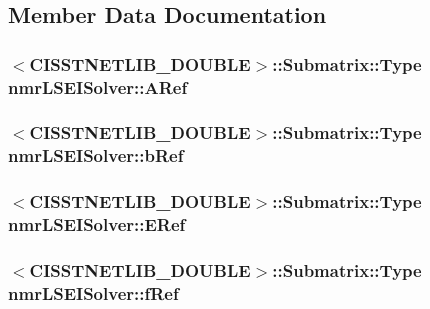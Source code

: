 \subsection{Member Data Documentation}
\hypertarget{classnmr_l_s_e_i_solver_aec36ff37069c0f838c9cf92b8ab607b9}{
\subsubsection[{A\-Ref}]{$<$C\-I\-S\-S\-T\-N\-E\-T\-L\-I\-B\-\_\-\-D\-O\-U\-B\-L\-E$>$\-::Submatrix\-::\-Type nmr\-L\-S\-E\-I\-Solver\-::\-A\-Ref\hspace{0.3cm}{\ttfamily [protected]}}}\label{classnmr_l_s_e_i_solver_aec36ff37069c0f838c9cf92b8ab607b9}
\hypertarget{classnmr_l_s_e_i_solver_a379afee982530ff5d7d0c60b6b1a71d6}{
\subsubsection[{b\-Ref}]{$<$C\-I\-S\-S\-T\-N\-E\-T\-L\-I\-B\-\_\-\-D\-O\-U\-B\-L\-E$>$\-::Submatrix\-::\-Type nmr\-L\-S\-E\-I\-Solver\-::b\-Ref\hspace{0.3cm}{\ttfamily [protected]}}}\label{classnmr_l_s_e_i_solver_a379afee982530ff5d7d0c60b6b1a71d6}
\hypertarget{classnmr_l_s_e_i_solver_a13a0319be7a8773f42b2d6b26b33001e}{
\subsubsection[{E\-Ref}]{$<$C\-I\-S\-S\-T\-N\-E\-T\-L\-I\-B\-\_\-\-D\-O\-U\-B\-L\-E$>$\-::Submatrix\-::\-Type nmr\-L\-S\-E\-I\-Solver\-::\-E\-Ref\hspace{0.3cm}{\ttfamily [protected]}}}\label{classnmr_l_s_e_i_solver_a13a0319be7a8773f42b2d6b26b33001e}
\hypertarget{classnmr_l_s_e_i_solver_abecdcb81cac955ea6a1f36eb305fb13f}{
\subsubsection[{f\-Ref}]{$<$C\-I\-S\-S\-T\-N\-E\-T\-L\-I\-B\-\_\-\-D\-O\-U\-B\-L\-E$>$\-::Submatrix\-::\-Type nmr\-L\-S\-E\-I\-Solver\-::f\-Ref\hspace{0.3cm}{\ttfamily [protected]}}}\label{classnmr_l_s_e_i_solver_abecdcb81cac955ea6a1f36eb305fb13f}
